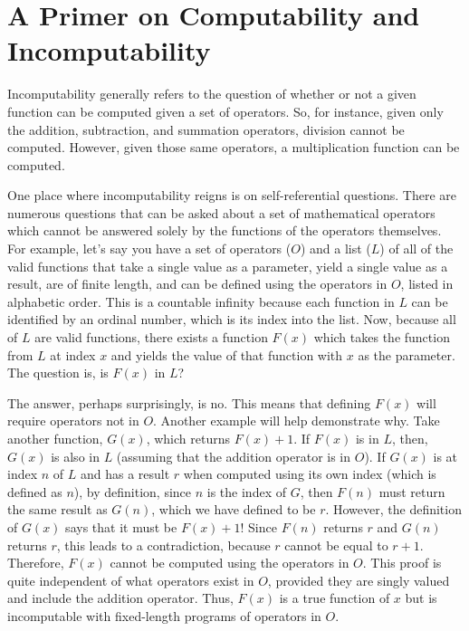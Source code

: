 \section{A Primer on Computability and Incomputability}

Incomputability generally refers to the question of whether or not a given function can be computed given a set of operators.  So, for instance, given only the addition, subtraction, and summation operators, division cannot be computed.  However, given those same operators, a multiplication function can be computed.  

One place where incomputability reigns is on self-referential questions.  There are numerous questions that can be asked about a set of mathematical operators which cannot be answered solely by the functions of the operators themselves.  For example, let's say you have a set of operators ($O$) and a list ($L$) of all of the valid functions that take a single value as a parameter, yield a single value as a result, are of finite length, and can be defined using the operators in $O$, listed in alphabetic order.  This is a countable infinity because each function in $L$ can be identified by an ordinal number, which is its index into the list.  Now, because all of $L$ are valid functions, there exists a function $F(x)$ which takes the function from $L$ at index $x$ and yields the value of that function with $x$ as the parameter.  The question is, is $F(x)$ in $L$?  

The answer, perhaps surprisingly, is no.  This means that defining $F(x)$ will require operators not in $O$.  Another example will help demonstrate why. Take another function, $G(x)$, which returns $F(x) + 1$.  If $F(x)$ is in $L$, then, $G(x)$ is also in $L$ (assuming that the addition operator is in $O$).  If $G(x)$ is at index $n$ of $L$ and has a result $r$ when computed using its own index (which is defined as $n$), by definition, since $n$ is the index of $G$, then $F(n)$ must return the same result as $G(n)$, which we have defined to be $r$.  However, the definition of $G(x)$ says that it must be $F(x) + 1$!  Since $F(n)$ returns $r$ and $G(n)$ returns $r$, this leads to a contradiction, because $r$ cannot be equal to $r + 1$.  Therefore, $F(x)$ cannot be computed using the operators in $O$.  This proof is quite independent of what operators exist in $O$, provided they are singly valued and include the addition operator.  Thus, $F(x)$ is a true function of $x$ but is incomputable with fixed-length programs of operators in $O$.

